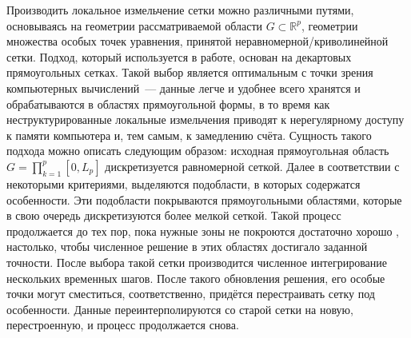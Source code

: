 Производить локальное измельчение сетки можно различными путями, основываясь на геометрии рассматриваемой области $G\subset\mathbb{R}^p$, геометрии множества особых точек уравнения, принятой неравномерной/криволинейной сетки.
Подход, который используется в работе, основан на декартовых прямоугольных сетках.
Такой выбор является оптимальным с точки зрения компьютерных вычислений~--- данные легче и удобнее всего хранятся и обрабатываются в областях прямоугольной формы, в то время как неструктурированные локальные измельчения приводят к нерегулярному доступу к памяти компьютера и, тем самым, к замедлению счёта.
Сущность такого подхода можно описать следующим образом: исходная прямоугольная область
$
    G = \prod_{k = 1}^{p} [0, L_p]
$
дискретизуется равномерной сеткой.
Далее в соответствии с некоторыми критериями, выделяются подобласти, в которых содержатся особенности.
Эти подобласти покрываются прямоугольными областями, которые в свою очередь дискретизуются более мелкой сеткой.
Такой процесс продолжается до тех пор, пока нужные зоны \glqq не покроются достаточно хорошо \grqq, настолько, чтобы численное решение в этих областях достигало заданной точности.
После выбора такой сетки производится численное интегрирование нескольких временных шагов.
После такого обновления решения, его особые точки могут сместиться, соответственно, придётся перестраивать сетку под особенности.
Данные переинтерполируются со старой сетки на новую, перестроенную, и процесс продолжается снова.

